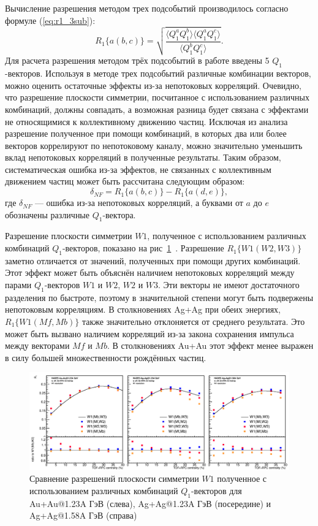 Вычисление разрешения методом трех подсобытий производилось согласно формуле (\ref{eq:r1_3sub}):
\begin{equation}
    R_1\{a(b,c)\}  =  \sqrt { \frac{ \langle Q_1^a Q_1^b \rangle \langle Q_1^a Q_1^c \rangle }{ \langle Q_1^b Q_1^c \rangle} }.
\end{equation}
Для расчета разрешения методом трёх подсобытий в работе введены 5 $Q_1$-векторов. 
Используя в методе трех подсобытий различные комбинации векторов, можно оценить остаточные эффекты из-за непотоковых корреляций. 
Очевидно, что разрешение плоскости симметрии, посчитанное с использованием различных комбинаций, должны совпадать, а возможная разница будет связана с эффектами не относящимися к коллективному движению частиц.
Исключая из анализа разрешение полученное при помощи комбинаций, в которых два или более векторов коррелируют по непотоковому каналу, можно значительно уменьшить вклад непотоковых корреляций в полученные результаты.
Таким образом, систематическая ошибка из-за эффектов, не связанных с коллективным движением частиц может быть рассчитана следующим образом:
\begin{equation}
    \delta_{NF} = R_1\{a(b,c)\} - R_1\{a(d,e)\},
\end{equation}
где $\delta_{NF}$ --- ошибка из-за непотоковых корреляций, а буквами от $a$ до $e$ обозначены различные $Q_1$-вектора.

Разрешение плоскости симметрии $W1$, полученное с использованием различных комбинаций $Q_1$-векторов, показано на рис~\ref{fig:hades_w1_combinations}~\cite{Mamaev:2020qom}.
Разрешение $R_1\{W1(W2,W3)\}$ заметно отличается от значений, полученных при помощи других комбинаций. 
Этот эффект может быть объяснён наличием непотоковых корреляций между парами $Q_1$-векторов $W1$ и $W2$, $W2$ и $W3$.
Эти векторы не имеют достаточного разделения по быстроте, поэтому в значительной степени могут быть подвержены непотоковым корреляциям. 
В столкновениях Ag+Ag при обеих энергиях, $R_1\{W1(Mf,Mb)\}$ также значительно отклоняется от среднего результата. 
Это может быть вызвано наличием корреляций из-за закона сохранения импульса между векторами $Mf$ и $Mb$. 
В столкновениях Au+Au этот эффект менее выражен в силу большей множественности рождённых частиц.
%
\begin{figure}[ht]
\begin{center}
\includegraphics[width=0.75\linewidth]{images/W1_combinations.png}
\caption{Сравнение разрешений плоскости симметрии $W1$ полученное с использованием различных комбинаций $Q_1$-векторов для Au+Au@1.23A ГэВ (слева), Ag+Ag@1.23A ГэВ (посередине) и Ag+Ag@1.58A ГэВ (справа)}
\label{fig:hades_w1_combinations}
\end{center}
\end{figure}

